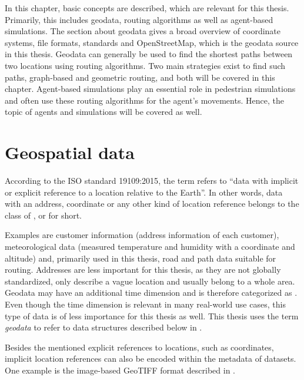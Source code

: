 
In this chapter, basic concepts are described, which are relevant for this thesis.
Primarily, this includes geodata, routing algorithms as well as agent-based simulations.
The section about geodata gives a broad overview of coordinate systems, file formats, standards and OpenStreetMap, which is the geodata source in this thesis.
Geodata can generally be used to find the shortest paths between two locations using routing algorithms.
Two main strategies exist to find such paths, graph-based and geometric routing, and both will be covered in this chapter.
Agent-based simulations play an essential role in pedestrian simulations and often use these routing algorithms for the agent's movements.
Hence, the topic of agents and simulations will be covered as well.

\section{Geospatial data}

	According to the ISO standard 19109:2015\cite{iso-19109}, the term  refers to \enquote{data with implicit or explicit reference to a location relative to the Earth}.
	In other words, data with an address, coordinate or any other kind of location reference belongs to the class of , or  for short.
	
	Examples are customer information (address information of each customer), meteorological data (measured temperature and humidity with a coordinate and altitude) and, primarily used in this thesis, road and path data suitable for routing.
	Addresses are less important for this thesis, as they are not globally standardized, only describe a vague location and usually belong to a whole area.
	Geodata may have an additional time dimension and is therefore categorized as \cite{iso-19108}.
	Even though the time dimension is relevant in many real-world use cases, this type of data is of less importance for this thesis as well.
	This thesis uses the term \emph{geodata} to refer to data structures described below in .
	
	Besides the mentioned explicit references to locations, such as coordinates, implicit location references can also be encoded within the metadata of datasets.
	One example is the image-based GeoTIFF format described in .
		
